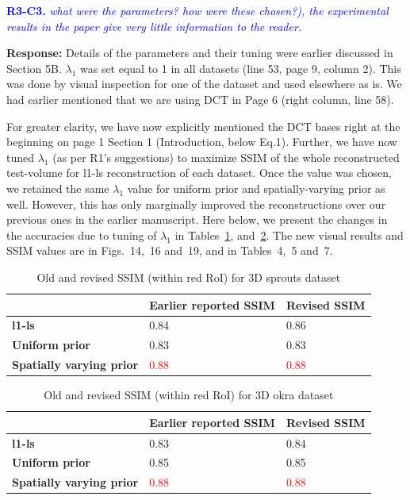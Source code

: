 \documentclass{article}
\begin{document}
\textcolor{blue}{\textbf{R3-C3.}\textit{ what were the parameters? how were these chosen?), the experimental results in the paper give very little information to the reader.}}

\textbf{ Response:} Details of the parameters and their tuning were earlier discussed in Section 5B. $\lambda_1$ was set equal to 1 in all datasets (line 53, page 9, column 2).  This was done by visual inspection for one of the dataset and used elsewhere as is. We had earlier mentioned that we are using DCT in Page 6 (right column, line 58). 

For greater clarity, we have now explicitly mentioned the DCT bases right at the beginning on page 1 Section 1 (Introduction, below Eq.1).  Further, we have now tuned $\lambda_1$ (as per R1's suggestions) to maximize SSIM of the whole reconstructed test-volume for l1-ls reconstruction of each dataset. Once the value was chosen, we retained the same $\lambda_1$ value for uniform prior and spatially-varying prior as well. However, this has only marginally improved the reconstructions over our previous ones in the earlier manuscript. Here below, we present the changes in the accuracies due to tuning of $\lambda_1$ in Tables~\ref{tab:sprouts_revised_ssim}, and~\ref{tab:okra_revised_ssim}. The new visual results and SSIM values are in Figs.~14,~16 and~19, and in Tables~4,~5 and~7. 


\begin{table}[!h]
  \centering
  \caption{Old and revised SSIM (within red RoI) for 3D sprouts dataset}
  \label{tab:sprouts_revised_ssim}
\begin{tabular}{|l|l|l|}
\hline
 & \textbf{Earlier reported SSIM} & \textbf{Revised SSIM} \\ \hline
\textbf{l1-ls} & 0.84 & 0.86 \\ \hline
\textbf{Uniform prior} & 0.83 & 0.83 \\ \hline
\textbf{Spatially varying prior} & \textcolor{red}{0.88} & \textcolor{red}{0.88} \\ \hline
\end{tabular}
\end{table}


\begin{table}[!h]
  \centering
  \caption{Old and revised SSIM (within red RoI) for 3D okra dataset}
  \label{tab:okra_revised_ssim}
\begin{tabular}{|l|l|l|}
\hline
 & \textbf{Earlier reported SSIM} & \textbf{Revised SSIM} \\ \hline
\textbf{l1-ls} & 0.83 & 0.84 \\ \hline
\textbf{Uniform prior} & 0.85 & 0.85 \\ \hline
\textbf{Spatially varying prior} & \textcolor{red}{0.88} & \textcolor{red}{0.88} \\ \hline
\end{tabular}
\end{table}
\end{document}
